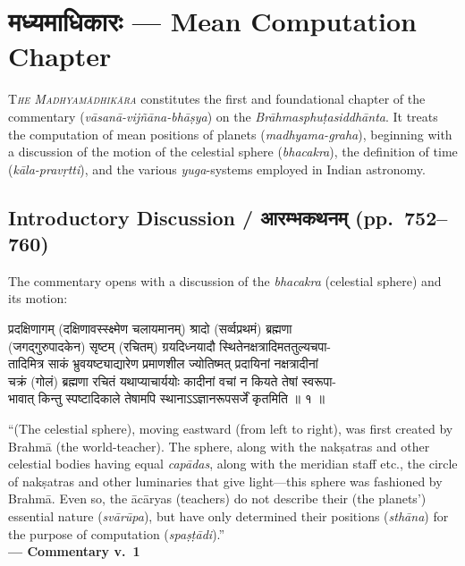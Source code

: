 \documentclass[11pt,a4paper]{article}
\newcommand{\dev}[1]{{\devanagarifont #1}}
\newenvironment{bilingualverse}{%
  \begin{paracol}{2}
  \fontsize{10.5}{13}\selectfont
}{%
  \end{paracol}
  \vspace{0.3cm}
}
\newenvironment{paracol}[1]{\begingroup}{\endgroup}
\newenvironment{leftcolumn*}{\begingroup}{\endgroup}
\newenvironment{rightcolumn}{\begingroup}{\endgroup}
\begin{document}
\newpage

\section*{\dev{मध्यमाधिकारः} — Mean Computation Chapter}

\lettrine[lines=3,loversize=0.1]{T}{\textit{he Madhyamādhikāra}} constitutes the first and foundational chapter of the commentary (\textit{vāsanā-vijñāna-bhāṣya}) on the \textit{Brāhmasphuṭasiddhānta}. It treats the computation of mean positions of planets (\textit{madhyama-graha}), beginning with a discussion of the motion of the celestial sphere (\textit{bhacakra}), the definition of time (\textit{kāla-pravṛtti}), and the various \textit{yuga}-systems employed in Indian astronomy.

\subsection*{Introductory Discussion / \dev{आरम्भकथनम्} (pp.\ 752--760)}

The commentary opens with a discussion of the \textit{bhacakra} (celestial sphere) and its motion:

\begin{bilingualverse}
\begin{leftcolumn*}
\dev{प्रदक्षिणागम् (दक्षिणावस्स्क्ष्मेण चलायमानम्) श्रादो (सर्व्वप्रथमं) ब्रह्मणा}\\
\dev{(जगद्गुरुपादकेन) सृष्टम् (रचितम्) ग्रयदिध्नयादौ स्थितेनक्षत्रादिमततुल्यचपा-}\\
\dev{तादिमित्र साकं भ्रुवयष्ट्याद्यारेण प्रमाणशील ज्योतिष्मत् प्रदायिनां नक्षत्रादीनां}\\
\dev{चक्रं (गोलं) ब्रह्मणा रचितं यथाप्याचार्ययोः कादीनां वचां न कियते तेषां स्वरूपा-}\\
\dev{भावात् किन्तु स्पष्टादिकाले तेषामपि स्थानाऽऽज्ञानरूपसर्जें कृतमिति ॥ १ ॥}
\end{leftcolumn*}
\begin{rightcolumn}
``(The celestial sphere), moving eastward (from left to right), was first created by Brahmā (the world-teacher). The sphere, along with the nakṣatras and other celestial bodies having equal \textit{capādas}, along with the meridian staff etc., the circle of nakṣatras and other luminaries that give light---this sphere was fashioned by Brahmā. Even so, the ācāryas (teachers) do not describe their (the planets') essential nature (\textit{svārūpa}), but have only determined their positions (\textit{sthāna}) for the purpose of computation (\textit{spaṣṭādi}).''\\[0.3cm]
\hfill\textbf{— Commentary v.\ 1}
\end{rightcolumn}
\end{bilingualverse}
\end{document}
